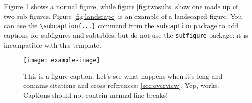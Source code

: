 \documentclass{class}
\begin{document}
Figure \ref{fig:example} shows a normal figure, while figure \ref{fig:twosubs} show one made up of two sub-figures. Figure \ref{fig:landscape} is an example of a landscaped figure. You can use the \verb|\subcaption{...}| command from the \texttt{subcaption} package to add captions for subfigures and subtables, but do not use the \texttt{subfigure} package: it is incompatible with this template.

\begin{figure}[bt]
  \centering
  \texttt{[image: example-image]}
  \caption{This is a figure caption. Let's see what happens when it's long and contains citations \citep{geiger2012we} and cross-references: \ref{sec:overview}. Yep, works. Captions should not contain manual line breaks!}
  \label{fig:example}
\end{figure}
\end{document}
